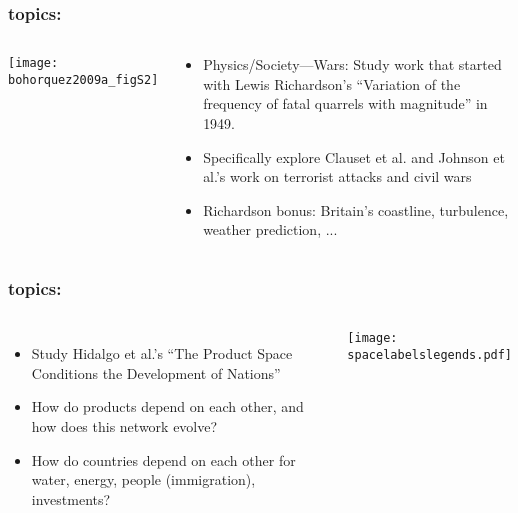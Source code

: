   \begin{frame}
    \frametitle{topics:}

    \begin{columns}
      \texttt{[image: bohorquez2009a\_figS2]}
      \begin{block}{}
      \begin{itemize}
      \item<1->
        Physics/Society---\alert{Wars:} Study work that
        started with Lewis Richardson's ``Variation of the frequency of
        fatal quarrels with magnitude'' in 1949.
      \item<2->
        Specifically explore Clauset et al. 
        and Johnson et al.'s work\cite{clauset2007b,johnson2006a,bohorquez2009a}
        on terrorist attacks and civil wars
      \item<3->
        Richardson bonus: Britain's coastline, turbulence, weather prediction, ...
      \end{itemize}
      \end{block}
    \end{columns}

  \end{frame}


  \begin{frame}
    \frametitle{topics:}

    \begin{block}{}
    \begin{columns}
      \begin{itemize}
      \item 
        Study Hidalgo et al.'s ``The Product Space Conditions the Development of Nations''\cite{hidalgo2007a}
      \item 
        How do products depend on each other, and how does this network evolve?
      \item 
        How do countries depend on
        each other for water, energy, people (immigration), investments?
      \end{itemize}      
      \texttt{[image: spacelabelslegends.pdf]}
    \end{columns}
    \end{block}

  \end{frame}

